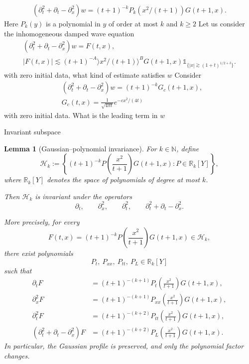 \documentclass[11pt]{amsart}
\makeatletter
\newtheorem{lemma}{Lemma}[section]
\theoremstyle{definition}
\theoremstyle{remark}
\numberwithin{equation}{section}
\def\section{\@startsection{section}{1}%
  \z@{1.5\linespacing\@plus\linespacing}{.5\linespacing}%
  {\normalfont\bfseries\large\centering}}
\makeatother
\begin{document}
\begin{equation}
    \begin{aligned}
        (\partial_t^2+\partial_t-\partial_x^2)w
=
(t+1)^{-k} P_k( x^2/(t+1)) G(t+1,x).
    \end{aligned}
\end{equation}
Here $P_k(y)$ is a polynomial in $y$ of order at most $k$ and $k \geq 2$
Let us consider the inhomogeneous damped wave equation
\begin{equation}
    \begin{aligned}
        (\partial_t^2+\partial_t-\partial_x^2)w
= F(t,x), \\
|F(t,x)| \lesssim 
(t+1)^{-A} \rangle x^2/(t+1)\rangle^B G(t+1,x)  \mathds{1}_{\{|x|\gtrsim (1+t)^{1/2+\delta}\}}.
    \end{aligned}
\end{equation}
with zero initial data, what kind of estimate satisfies $w$
Consider
\begin{equation}
    \begin{aligned}
   &     (\partial_t^2+\partial_t-\partial_x^2)w
=
(t+1)^{-k}  G_c(t+1,x), \\
& G_c(t,x) = \frac{1}{\sqrt{4\pi t}} e^{-c x^2/(4t)}
    \end{aligned}
\end{equation}
with zero initial data. What is the leading term in $w$
\appendix



\section{Invariant subspace}



\begin{lemma}[Gaussian--polynomial invariance]
\label{lem:gaussian-polynomial-invariance}
For $k\in\mathbb N$, define
\[
\mathcal H_k
:=
\left\{
(t+1)^{-k}
P\!\left(\frac{x^2}{t+1}\right)
G(t+1,x)
:
P\in\mathbb R_k[Y]
\right\},
\]
where $\mathbb R_k[Y]$ denotes the space of polynomials of degree at
most $k$.

Then $\mathcal H_k$ is invariant under the operators
\[
\partial_t,
\qquad
\partial_x^2,
\qquad
\partial_t^2,
\qquad
\partial_t^2+\partial_t-\partial_x^2 .
\]

More precisely, for every
\[
F(t,x)
=
(t+1)^{-k}
P\!\left(\frac{x^2}{t+1}\right)
G(t+1,x)
\in\mathcal H_k,
\]
there exist polynomials
\[
P_t,\ P_{xx},\ P_{tt},\ P_L
\in\mathbb R_k[Y]
\]
such that
\begin{align*}
\partial_tF
&=
(t+1)^{-(k+1)}
P_t\!\left(\frac{x^2}{t+1}\right)
G(t+1,x),
\\
\partial_x^2F
&=
(t+1)^{-(k+1)}
P_{xx}\!\left(\frac{x^2}{t+1}\right)
G(t+1,x),
\\
\partial_t^2F
&=
(t+1)^{-(k+2)}
P_{tt}\!\left(\frac{x^2}{t+1}\right)
G(t+1,x),
\\
(\partial_t^2+\partial_t-\partial_x^2)F
&=
(t+1)^{-(k+2)}
P_L\!\left(\frac{x^2}{t+1}\right)
G(t+1,x).
\end{align*}
In particular, the Gaussian profile is preserved, and only the
polynomial factor changes.
\end{lemma}
\end{document}

